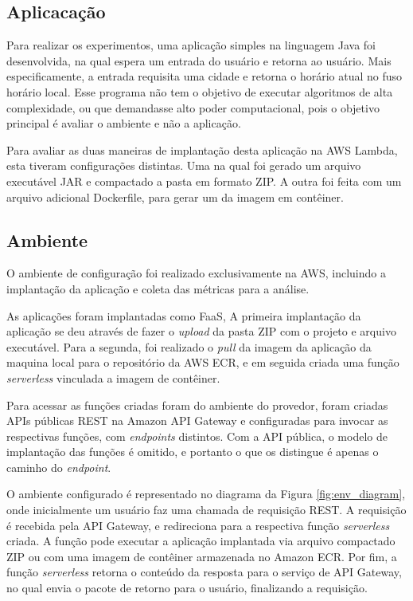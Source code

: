 \documentclass[conference]{IEEEtran}
\begin{document}
\subsection{Aplicacação}
\label{subsec:application}

Para realizar os experimentos, uma aplicação simples na linguagem Java foi desenvolvida, na qual espera um entrada do usuário e retorna ao usuário. Mais especificamente, a entrada requisita uma cidade e retorna o horário atual no fuso horário local. Esse programa não tem o objetivo de executar algoritmos de alta complexidade, ou que demandasse alto poder computacional, pois o objetivo principal é avaliar o ambiente e não a aplicação.

Para avaliar as duas maneiras de implantação desta aplicação na AWS Lambda, esta tiveram configurações distintas. Uma na qual foi gerado um arquivo executável JAR e compactado a pasta em formato ZIP. A outra foi feita com um arquivo adicional Dockerfile, para gerar um  da imagem em contêiner.

\subsection{Ambiente}
\label{subsec:environment}

O ambiente de configuração foi realizado exclusivamente na AWS, incluindo a implantação da aplicação e coleta das métricas para a análise.

As aplicações foram implantadas como FaaS, A primeira implantação da aplicação se deu através de fazer o \textit{upload} da pasta ZIP com o projeto e arquivo executável. Para a segunda, foi realizado o \textit{pull} da imagem da aplicação da maquina local para o repositório da AWS ECR, e em seguida criada uma função \textit{serverless} vinculada a imagem de contêiner.

Para acessar as funções criadas foram do ambiente do provedor, foram criadas APIs públicas REST na Amazon API Gateway e configuradas para invocar as respectivas funções, com \textit{endpoints} distintos. Com a API pública, o modelo de implantação das funções é omitido, e portanto o que os distingue é apenas o caminho do \textit{endpoint}.

O ambiente configurado é representado no diagrama da Figura \ref{fig:env_diagram}, onde inicialmente um usuário faz uma chamada de requisição REST. A requisição é recebida pela API Gateway, e redireciona para a respectiva função \textit{serverless} criada. A função pode executar a aplicação implantada via arquivo compactado ZIP ou com uma imagem de contêiner armazenada no Amazon ECR. Por fim, a função \textit{serverless} retorna o conteúdo da resposta para o serviço de API Gateway, no qual envia o pacote de retorno para o usuário, finalizando a requisição.
\end{document}

